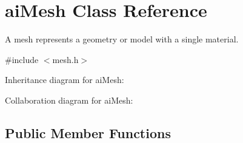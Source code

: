\hypertarget{structai_mesh}{\section{ai\+Mesh Class Reference}
\label{structai_mesh}
}


A mesh represents a geometry or model with a single material.  




{\ttfamily \#include $<$mesh.\+h$>$}



Inheritance diagram for ai\+Mesh\+:


Collaboration diagram for ai\+Mesh\+:
\subsection*{Public Member Functions}
